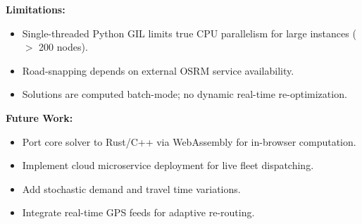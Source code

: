 \documentclass[10pt,conference]{IEEEtran}
\begin{document}
\textbf{Limitations:}
\begin{itemize}
    \item Single-threaded Python GIL limits true CPU parallelism for large instances ($>$ 200 nodes).
    \item Road-snapping depends on external OSRM service availability.
    \item Solutions are computed batch-mode; no dynamic real-time re-optimization.
\end{itemize}

\textbf{Future Work:}
\begin{itemize}
    \item Port core solver to Rust/C++ via WebAssembly for in-browser computation.
    \item Implement cloud microservice deployment for live fleet dispatching.
    \item Add stochastic demand and travel time variations.
    \item Integrate real-time GPS feeds for adaptive re-routing.
\end{itemize}
\end{document}
